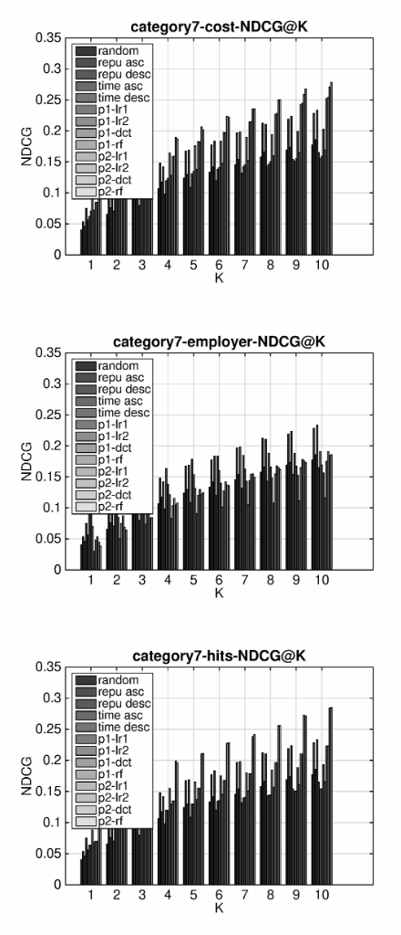 \documentclass{article}
\begin{document}
\begin{figure}[ht]
\begin{flushleft}
\includegraphics[width=18cm,height=9cm]{category7-cost-NDCG@K.eps}
\includegraphics[width=18cm,height=9cm]{category7-employer-NDCG@K.eps}
\includegraphics[width=18cm,height=9cm]{category7-hits-NDCG@K.eps}
\end{flushleft}
\end{figure}
\end{document}
